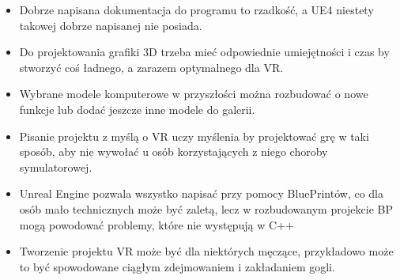 \documentclass[a4paper,12pt,reqno]{article}
\begin{document}
\begin{itemize}
\item Dobrze napisana dokumentacja do programu to rzadkość, a UE4 niestety takowej dobrze napisanej nie posiada.
\item Do projektowania grafiki 3D trzeba mieć odpowiednie umiejętności i czas by stworzyć coś ładnego, a zarazem optymalnego dla VR.
\item Wybrane modele komputerowe w przyszłości można rozbudować o nowe funkcje lub dodać jeszcze inne modele do galerii.
\item Pisanie projektu z myślą o VR uczy myślenia by projektować grę w taki sposób, aby nie wywołać u osób korzystających z niego choroby symulatorowej.
\item Unreal Engine pozwala wszystko napisać przy pomocy BluePrintów, co dla osób mało technicznych może być zaletą, lecz w rozbudowanym projekcie BP mogą powodować problemy, które nie występują w C++
\item Tworzenie projektu VR może być dla niektórych męczące, przykładowo może to być spowodowane ciągłym zdejmowaniem i zakładaniem gogli.
\end{itemize}

\newpage



\end{document}
